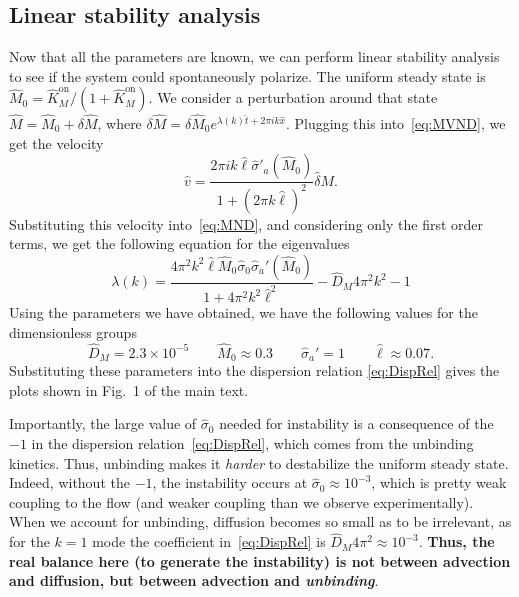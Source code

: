 \documentclass[11pt]{article}
\newcommand{\6}[1]{#1_{\text{6}}}
\newcommand{\3}[1]{#1_{\text{3}}}
\begin{document}
\subsection{Linear stability analysis \label{sec:StabMy}}
Now that all the parameters are known, we can perform linear stability analysis to see if the system could spontaneously polarize. The uniform steady state is $\hat{M}_0= \hat{K}^\text{on}_M/\left(1+\hat{K}^\text{on}_M\right)$. We consider a perturbation around that state $\hat M=\hat{M}_0+\delta \hat M$, where $\delta \hat M = \delta \hat M_0 e^{\lambda(k) \hat{t}+2 \pi i k \hat{x}}$. Plugging this into\ \eqref{eq:MVND}, we get the velocity \cite[Eq.~(11)]{bois2011pattern}
\begin{equation}
\hat v = \frac{2 \pi i k \hat{\ell} \hat{\sigma}'_a(\hat M_0)}{1 + \left(2 \pi k \hat \ell\right)^2} \hat \delta M. 
\end{equation}
Substituting this velocity into\ \eqref{eq:MND}, and considering only the first order terms, we get the following equation for the eigenvalues
\begin{equation}
\label{eq:DispRel}
\lambda(k) = \frac{4\pi^2 k^2 \hat{\ell} \hat{M}_0 \hat{\sigma}_0 \hat \sigma_a'(\hat{M}_0)}{1+4\pi^2 k^2 \hat{\ell}^2} - \hat{D}_M 4 \pi^2 k^2 -1
\end{equation}
Using the parameters we have obtained, we have the following values for the dimensionless groups
\begin{equation}
\hat{D}_M = 2.3 \times 10^{-5} \qquad \hat{M}_0 \approx 0.3 \qquad \hat \sigma_a'=1 \qquad \hat{\ell} \approx 0.07.
\end{equation}
Substituting these parameters into the dispersion relation \eqref{eq:DispRel} gives the plots shown in Fig.\ 1 of the main text.

Importantly, the large value of $\hat \sigma_0$ needed for instability is a consequence of the $-1$ in the dispersion relation\ \eqref{eq:DispRel}, which comes from the unbinding kinetics. Thus, unbinding makes it \emph{harder} to destabilize the uniform steady state. Indeed, without the $-1$, the instability occurs at $\hat{\sigma}_0 \approx 10^{-3}$, which is pretty weak coupling to the flow (and weaker coupling than we observe experimentally). When we account for unbinding, diffusion becomes so small as to be irrelevant, as for the $k=1$ mode the coefficient in\ \eqref{eq:DispRel} is $\hat{D}_M 4 \pi^2 \approx 10^{-3}$. \textbf{Thus, the real balance here (to generate the instability) is not between advection and diffusion, but between advection and \emph{unbinding}}. 
\end{document}
